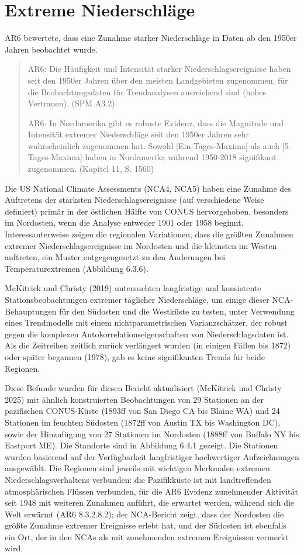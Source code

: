 \documentclass[12pt,paper=a4,DIV=12,parskip=never,chapterprefix=false,headings=standardclasses]{scrreprt}
\begin{document}
\section{Extreme Niederschläge}
AR6 bewertete, dass eine Zunahme starker Niederschläge in Daten ab den 1950er Jahren beobachtet wurde.
\begin{quote}
AR6: Die Häufigkeit und Intensität starker Niederschlagsereignisse haben seit den 1950er Jahren über den meisten Landgebieten zugenommen, für die Beobachtungsdaten für Trendanalysen ausreichend sind (hohes Vertrauen). (SPM A3.2)

AR6: In Nordamerika gibt es robuste Evidenz, dass die Magnitude und Intensität extremer Niederschläge seit den 1950er Jahren sehr wahrscheinlich zugenommen hat. Sowohl [Ein-Tages-Maxima] als auch [5-Tages-Maxima] haben in Nordamerika während 1950-2018 signifikant zugenommen. (Kapitel 11, S. 1560)
\end{quote}

Die US National Climate Assessments (NCA4, NCA5) haben eine Zunahme des Auftretens der stärksten Niederschlagsereignisse (auf verschiedene Weise definiert) primär in der östlichen Hälfte von CONUS hervorgehoben, besonders im Nordosten, wenn die Analyse entweder 1901 oder 1958 beginnt. Interessanterweise zeigen die regionalen Variationen, dass die größten Zunahmen extremer Niederschlagsereignisse im Nordosten und die kleinsten im Westen auftreten, ein Muster entgegengesetzt zu den Änderungen bei Temperaturextremen (Abbildung 6.3.6).

McKitrick und Christy (2019) untersuchten langfristige und konsistente Stationsbeobachtungen extremer täglicher Niederschläge, um einige dieser NCA-Behauptungen für den Südosten und die Westküste zu testen, unter Verwendung eines Trendmodells mit einem nichtparametrischen Varianzschätzer, der robust gegen die komplexen Autokorrelationseigenschaften von Niederschlagsdaten ist. Als die Zeitreihen zeitlich zurück verlängert wurden (in einigen Fällen bis 1872) oder später begannen (1978), gab es keine signifikanten Trends für beide Regionen.

Diese Befunde wurden für diesen Bericht aktualisiert (McKitrick und Christy 2025) mit ähnlich konstruierten Beobachtungen von 29 Stationen an der pazifischen CONUS-Küste (1893ff von San Diego CA bis Blaine WA) und 24 Stationen im feuchten Südosten (1872ff von Austin TX bis Washington DC), sowie der Hinzufügung von 27 Stationen im Nordosten (1888ff von Buffalo NY bis Eastport ME). Die Standorte sind in Abbildung 6.4.1 gezeigt. Die Stationen wurden basierend auf der Verfügbarkeit langfristiger hochwertiger Aufzeichnungen ausgewählt. Die Regionen sind jeweils mit wichtigen Merkmalen extremen Niederschlagsverhaltens verbunden: die Pazifikküste ist mit landtreffenden atmosphärischen Flüssen verbunden, für die AR6 Evidenz zunehmender Aktivität seit 1948 mit weiteren Zunahmen anführt, die erwartet werden, während sich die Welt erwärmt (AR6 8.3.2.8.2); der NCA-Bericht zeigt, dass der Nordosten die größte Zunahme extremer Ereignisse erlebt hat, und der Südosten ist ebenfalls ein Ort, der in den NCAs als mit zunehmenden extremen Ereignissen vermerkt wird.
\end{document}
